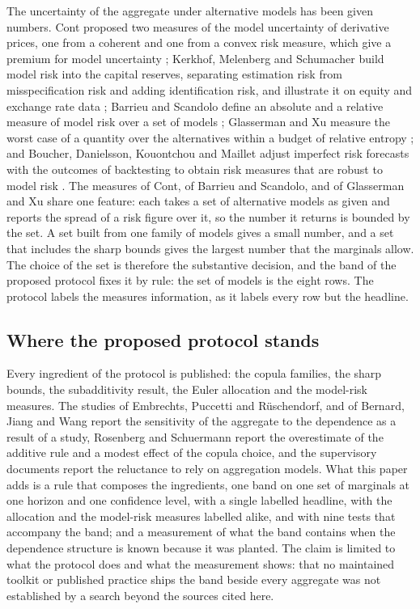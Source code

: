 The uncertainty of the aggregate under alternative models has been given numbers. Cont proposed two measures of the model uncertainty of derivative prices, one from a coherent and one from a convex risk
measure, which give a premium for model uncertainty \citep{cont2006}; Kerkhof, Melenberg and Schumacher build model risk into the
capital reserves, separating estimation risk from misspecification risk and adding identification risk, and illustrate it on equity
and exchange rate data \citep{kerkhof2010}; Barrieu and Scandolo define an absolute and a relative measure of model risk over a set of models
\citep{barrieu2015}; Glasserman and Xu measure the worst case of a quantity over the alternatives within a budget of relative
entropy \citep{glasserman2014}; and Boucher, Danielsson, Kouontchou and Maillet adjust imperfect risk forecasts with the outcomes of backtesting to obtain risk
measures that are robust to model risk \citep{boucher2014}. The measures of Cont, of Barrieu and Scandolo, and of Glasserman and Xu share one feature: each takes a set of alternative models as given and reports the spread of a
risk figure over it, so the number it returns is bounded by the set. A set built from one family of models gives a small number,
and a set that includes the sharp bounds gives the largest number that the marginals allow. The choice of the set is therefore the
substantive decision, and the band of the proposed protocol fixes it by rule: the set of models is the eight rows. The protocol
labels the measures information, as it labels every row but the headline.

\subsection{Where the proposed protocol stands}
\label{sec:rw-position}

Every ingredient of the protocol is published: the copula families, the sharp bounds, the subadditivity result, the Euler
allocation and the model-risk measures. The studies of Embrechts, Puccetti and R\"uschendorf, and of Bernard, Jiang and Wang
report the sensitivity of the aggregate to the dependence as a result of a study, Rosenberg and Schuermann report the overestimate
of the additive rule and a modest effect of the copula choice, and the supervisory documents report the
reluctance to rely on aggregation models. What this paper adds is a rule that composes the ingredients, one band on one set of
marginals at one horizon and one confidence level, with a single labelled headline, with the allocation and the model-risk
measures labelled alike, and with nine tests that accompany the band; and a measurement of what the band
contains when the dependence structure is known because it was planted. The claim is limited to what the protocol does and what
the measurement shows: that no maintained toolkit or published practice ships the band beside every aggregate was not established
by a search beyond the sources cited here.
